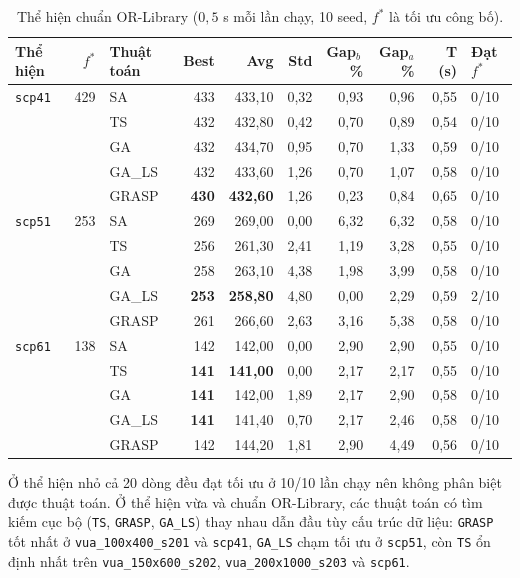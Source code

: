 \documentclass[a4paper,12pt]{article}
\begin{document}
\begin{table}[htbp]
\centering
\caption{Thể hiện chuẩn OR-Library ($0{,}5$ s mỗi lần chạy, 10 seed, $f^*$ là tối ưu công bố).}
\footnotesize
\setlength{\tabcolsep}{3pt}
\begin{tabularx}{\textwidth}{lrlrrrrrrY}
\toprule
Thể hiện & $f^*$ & Thuật toán & Best & Avg & Std & Gap$_b$\,\% & Gap$_a$\,\% & T (s) & Đạt $f^*$\\
\midrule
\texttt{scp41} & 429 & SA & 433 & 433{,}10 & 0{,}32 & 0{,}93 & 0{,}96 & 0{,}55 & 0/10\\
 &  & TS & 432 & 432{,}80 & 0{,}42 & 0{,}70 & 0{,}89 & 0{,}54 & 0/10\\
 &  & GA & 432 & 434{,}70 & 0{,}95 & 0{,}70 & 1{,}33 & 0{,}59 & 0/10\\
 &  & GA\_LS & 432 & 433{,}60 & 1{,}26 & 0{,}70 & 1{,}07 & 0{,}58 & 0/10\\
 &  & GRASP & \textbf{430} & \textbf{432{,}60} & 1{,}26 & 0{,}23 & 0{,}84 & 0{,}65 & 0/10\\
\midrule
\texttt{scp51} & 253 & SA & 269 & 269{,}00 & 0{,}00 & 6{,}32 & 6{,}32 & 0{,}58 & 0/10\\
 &  & TS & 256 & 261{,}30 & 2{,}41 & 1{,}19 & 3{,}28 & 0{,}55 & 0/10\\
 &  & GA & 258 & 263{,}10 & 4{,}38 & 1{,}98 & 3{,}99 & 0{,}58 & 0/10\\
 &  & GA\_LS & \textbf{253} & \textbf{258{,}80} & 4{,}80 & 0{,}00 & 2{,}29 & 0{,}59 & 2/10\\
 &  & GRASP & 261 & 266{,}60 & 2{,}63 & 3{,}16 & 5{,}38 & 0{,}58 & 0/10\\
\midrule
\texttt{scp61} & 138 & SA & 142 & 142{,}00 & 0{,}00 & 2{,}90 & 2{,}90 & 0{,}55 & 0/10\\
 &  & TS & \textbf{141} & \textbf{141{,}00} & 0{,}00 & 2{,}17 & 2{,}17 & 0{,}55 & 0/10\\
 &  & GA & \textbf{141} & 142{,}00 & 1{,}89 & 2{,}17 & 2{,}90 & 0{,}58 & 0/10\\
 &  & GA\_LS & \textbf{141} & 141{,}40 & 0{,}70 & 2{,}17 & 2{,}46 & 0{,}58 & 0/10\\
 &  & GRASP & 142 & 144{,}20 & 1{,}81 & 2{,}90 & 4{,}49 & 0{,}56 & 0/10\\
\bottomrule
\end{tabularx}
\label{tbl:meta_or}
\end{table}
Ở thể hiện nhỏ cả 20 dòng đều đạt tối ưu ở 10/10 lần chạy nên không phân biệt được thuật toán. Ở thể hiện vừa và chuẩn OR-Library, các thuật toán có tìm kiếm cục bộ (\texttt{TS}, \texttt{GRASP}, \texttt{GA\_LS}) thay nhau dẫn đầu tùy cấu trúc dữ liệu: \texttt{GRASP} tốt nhất ở \texttt{vua\_100x400\_s201} và \texttt{scp41}, \texttt{GA\_LS} chạm tối ưu ở \texttt{scp51}, còn \texttt{TS} ổn định nhất trên \texttt{vua\_150x600\_s202}, \texttt{vua\_200x1000\_s203} và \texttt{scp61}.
\end{document}
